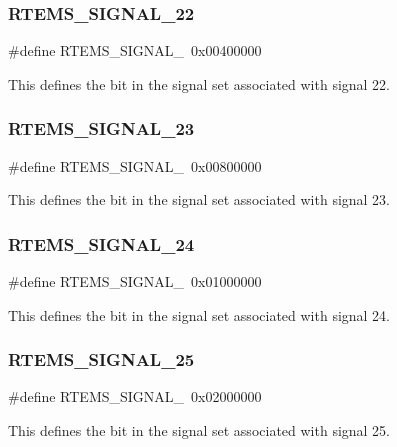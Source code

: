 \subsubsection{\texorpdfstring{RTEMS\_SIGNAL\_22}{RTEMS\_SIGNAL\_22}}
{\footnotesize\ttfamily \#define R\+T\+E\+M\+S\+\_\+\+S\+I\+G\+N\+A\+L\+\_~0x00400000}

This defines the bit in the signal set associated with signal 22. \mbox{\label{group__ClassicASR_ga06837f833462d04fc6b6b3390a575eec}} 
\subsubsection{\texorpdfstring{RTEMS\_SIGNAL\_23}{RTEMS\_SIGNAL\_23}}
{\footnotesize\ttfamily \#define R\+T\+E\+M\+S\+\_\+\+S\+I\+G\+N\+A\+L\+\_~0x00800000}

This defines the bit in the signal set associated with signal 23. \mbox{\label{group__ClassicASR_ga5172f163e3f6e8a4fabe7acd690362d6}} 
\subsubsection{\texorpdfstring{RTEMS\_SIGNAL\_24}{RTEMS\_SIGNAL\_24}}
{\footnotesize\ttfamily \#define R\+T\+E\+M\+S\+\_\+\+S\+I\+G\+N\+A\+L\+\_~0x01000000}

This defines the bit in the signal set associated with signal 24. \mbox{\label{group__ClassicASR_ga262d75b49961687942cce9478f891ee8}} 
\subsubsection{\texorpdfstring{RTEMS\_SIGNAL\_25}{RTEMS\_SIGNAL\_25}}
{\footnotesize\ttfamily \#define R\+T\+E\+M\+S\+\_\+\+S\+I\+G\+N\+A\+L\+\_~0x02000000}

This defines the bit in the signal set associated with signal 25. \mbox{\label{group__ClassicASR_ga8bd377ce75e8b4c628805cbb6e5d3244}} 
